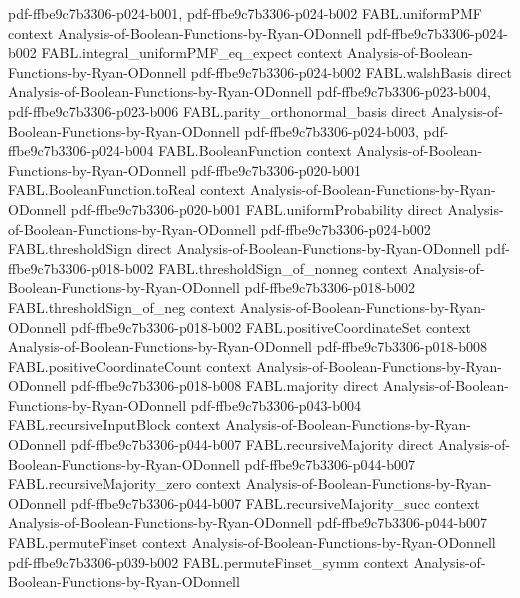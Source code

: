\begin{theorem}
  {pdf-ffbe9c7b3306-p024-b001,
    pdf-ffbe9c7b3306-p024-b002}
\proofstep
  {FABL.uniformPMF}
  {context}
  {Analysis-of-Boolean-Functions-by-Ryan-ODonnell}
  {pdf-ffbe9c7b3306-p024-b002}
\proofstep
  {FABL.integral_uniformPMF_eq_expect}
  {context}
  {Analysis-of-Boolean-Functions-by-Ryan-ODonnell}
  {pdf-ffbe9c7b3306-p024-b002}
\proofstep
  {FABL.walshBasis}
  {direct}
  {Analysis-of-Boolean-Functions-by-Ryan-ODonnell}
  {pdf-ffbe9c7b3306-p023-b004,
    pdf-ffbe9c7b3306-p023-b006}
\proofstep
  {FABL.parity_orthonormal_basis}
  {direct}
  {Analysis-of-Boolean-Functions-by-Ryan-ODonnell}
  {pdf-ffbe9c7b3306-p024-b003,
    pdf-ffbe9c7b3306-p024-b004}
\proofstep
  {FABL.BooleanFunction}
  {context}
  {Analysis-of-Boolean-Functions-by-Ryan-ODonnell}
  {pdf-ffbe9c7b3306-p020-b001}
\proofstep
  {FABL.BooleanFunction.toReal}
  {context}
  {Analysis-of-Boolean-Functions-by-Ryan-ODonnell}
  {pdf-ffbe9c7b3306-p020-b001}
\proofstep
  {FABL.uniformProbability}
  {direct}
  {Analysis-of-Boolean-Functions-by-Ryan-ODonnell}
  {pdf-ffbe9c7b3306-p024-b002}
\proofstep
  {FABL.thresholdSign}
  {direct}
  {Analysis-of-Boolean-Functions-by-Ryan-ODonnell}
  {pdf-ffbe9c7b3306-p018-b002}
\proofstep
  {FABL.thresholdSign_of_nonneg}
  {context}
  {Analysis-of-Boolean-Functions-by-Ryan-ODonnell}
  {pdf-ffbe9c7b3306-p018-b002}
\proofstep
  {FABL.thresholdSign_of_neg}
  {context}
  {Analysis-of-Boolean-Functions-by-Ryan-ODonnell}
  {pdf-ffbe9c7b3306-p018-b002}
\proofstep
  {FABL.positiveCoordinateSet}
  {context}
  {Analysis-of-Boolean-Functions-by-Ryan-ODonnell}
  {pdf-ffbe9c7b3306-p018-b008}
\proofstep
  {FABL.positiveCoordinateCount}
  {context}
  {Analysis-of-Boolean-Functions-by-Ryan-ODonnell}
  {pdf-ffbe9c7b3306-p018-b008}
\proofstep
  {FABL.majority}
  {direct}
  {Analysis-of-Boolean-Functions-by-Ryan-ODonnell}
  {pdf-ffbe9c7b3306-p043-b004}
\proofstep
  {FABL.recursiveInputBlock}
  {context}
  {Analysis-of-Boolean-Functions-by-Ryan-ODonnell}
  {pdf-ffbe9c7b3306-p044-b007}
\proofstep
  {FABL.recursiveMajority}
  {direct}
  {Analysis-of-Boolean-Functions-by-Ryan-ODonnell}
  {pdf-ffbe9c7b3306-p044-b007}
\proofstep
  {FABL.recursiveMajority_zero}
  {context}
  {Analysis-of-Boolean-Functions-by-Ryan-ODonnell}
  {pdf-ffbe9c7b3306-p044-b007}
\proofstep
  {FABL.recursiveMajority_succ}
  {context}
  {Analysis-of-Boolean-Functions-by-Ryan-ODonnell}
  {pdf-ffbe9c7b3306-p044-b007}
\proofstep
  {FABL.permuteFinset}
  {context}
  {Analysis-of-Boolean-Functions-by-Ryan-ODonnell}
  {pdf-ffbe9c7b3306-p039-b002}
\proofstep
  {FABL.permuteFinset_symm}
  {context}
  {Analysis-of-Boolean-Functions-by-Ryan-ODonnell}

\end{theorem}
